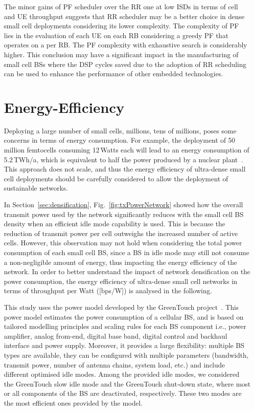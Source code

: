 \documentclass{IEEEtran}
\begin{document}
The minor gains of \ac{PF} scheduler over the \ac{RR} one at low \acp{ISD} in terms of cell and \ac{UE} throughput suggests that
\ac{RR} scheduler may be a better choice in dense small cell deployments considering its lower complexity.
The complexity of \ac{PF} lies in the evaluation of each \ac{UE} on each \ac{RB} considering a greedy \ac{PF} that operates on a per \ac{RB}.
The \ac{PF} complexity with exhaustive search is considerably higher.
This conclusion may have a significant impact in the manufacturing of small cell \acp{BS}
where the \ac{DSP} cycles saved due to the adoption of \ac{RR} scheduling can be used to enhance the performance of other embedded technologies.



\section{Energy-Efficiency}
\label{Sec:costAndEnergyEfficiency}

Deploying a large number of small cells, millions, tens of millions, poses some concerns in terms of energy consumption.
For example, the deployment of 50\,million femtocells consuming 12\,Watts each will lead to an energy consumption of 5.2\,TWh/a,
which is equivalent to half the power produced by a nuclear plant~\cite{Claussen2012P}.
This approach does not scale,
and thus the energy efficiency of ultra-dense small cell deployments should be carefully considered to allow the deployment of sustainable networks.

In Section~\ref{sec:densification},
Fig.~\ref{fig:txPowerNetwork} showed how the overall transmit power used by the network significantly reduces with the small cell \ac{BS} density
when an efficient idle mode capability is used.
This is because the reduction of transmit power per cell outweighs the increased number of active cells.
However, this observation may not hold when considering the total power consumption of each small cell \ac{BS},
since a \ac{BS} in idle mode may still not consume a non-negligible amount of energy,
thus impacting the energy efficiency of the network.
In order to better understand the impact of network densification on the power consumption,
the energy efficiency of ultra-dense small cell networks in terms of throughput per Watt ([bps/W]) is analysed in the following.

This study uses the power model developed by the GreenTouch project~\cite{DessetPowerModelling}.
This power model estimates the power consumption of a cellular \ac{BS},
and is based on tailored modelling principles and scaling rules for each \ac{BS} component
i.e., power amplifier, analog from-end, digital base band, digital control and backhaul interface and power supply.
Moreover, it provides a large flexibility:
multiple \ac{BS} types are available,
they can be configured with multiple parameters (bandwidth, transmit power, number of antenna chains, system load, etc.)
and include different optimised idle modes.
Among the provided idle modes,
we considered the GreenTouch slow idle mode and the GreenTouch shut-down state,
where most or all components of the \ac{BS} are deactivated, respectively.
These two modes are the most efficient ones provided by the model.
\end{document}
